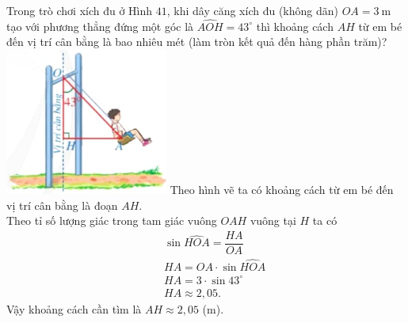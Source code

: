 \begin{bt}%
	\immini
	{
	Trong trò chơi xích đu ở Hình $41$, khi dây căng xích đu (không dãn) $OA=3 \mathrm{~m}$ tạo với phương thẳng đứng một góc là $\widehat{AOH}=43^{\circ}$ thì khoảng cách $AH$ từ em bé đến vị trí cân bằng là bao nhiêu mét (làm tròn kết quả đến hàng phần trăm)?
	}
	{
	\includegraphics[scale=.75]{images/9C4-OTC-1}
	}
	\loigiai
	{
	Theo hình vẽ ta có khoảng cách từ em bé đến vị trí cân bằng là đoạn $AH$.\\
	Theo tỉ số lượng giác trong tam giác vuông $OAH$ vuông tại $H$ ta có \allowdisplaybreaks
	\begin{eqnarray*}
	&&\sin\widehat{HOA}=\dfrac{HA}{OA}\\
	&& HA=OA\cdot\sin\widehat{HOA}\\
	&& HA=3\cdot\sin 43^\circ\\
	&& HA\approx 2{,}05.
	\end{eqnarray*}	
	Vậy khoảng cách cần tìm là $AH\approx 2{,}05$ (m).
	}
\end{bt}

